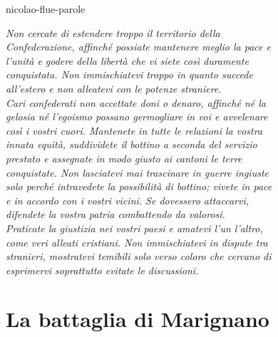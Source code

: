 \documentclass[preview]{standalone}
\begin{document}
\begin{snippet}{nicolao-flue-parole}
    \begin{center}
        \textit{Non cercate di estendere troppo il territorio della} \\
        \textit{Confederazione, affinché possiate mantenere meglio la pace e} \\
        \textit{l'unità e godere della libertà che vi siete così duramente} \\
        \textit{conquistata. Non immischiatevi troppo in quanto succede} \\
        \textit{all'estero e non alleatevi con le potenze straniere.} \\
        \textit{Cari confederati non accettate doni o denaro, affinché né la} \\
        \textit{gelosia né l'egoismo possano germogliare in voi e avvelenare} \\
        \textit{così i vostri cuori. Mantenete in tutte le relazioni la vostra} \\
        \textit{innata equità, suddividete il bottino a seconda del servizio} \\
        \textit{prestato e assegnate in modo giusto ai cantoni le terre} \\
        \textit{conquistate. Non lasciatevi mai trascinare in guerre ingiuste} \\
        \textit{solo perché intravedete la possibilità di bottino; vivete in pace} \\
        \textit{e in accordo con i vostri vicini. Se dovessero attaccarvi,} \\
        \textit{difendete la vostra patria combattendo da valorosi.} \\
        \textit{Praticate la giustizia nei vostri paesi e amatevi l'un l'altro,} \\
        \textit{come veri alleati cristiani. Non immischiatevi in dispute tra} \\
        \textit{stranieri, mostratevi temibili solo verso coloro che cercano di} \\
        \textit{esprimervi soprattutto evitate le discussioni.}
    \end{center}
\end{snippet}

\section{La battaglia di Marignano}
\end{document}

